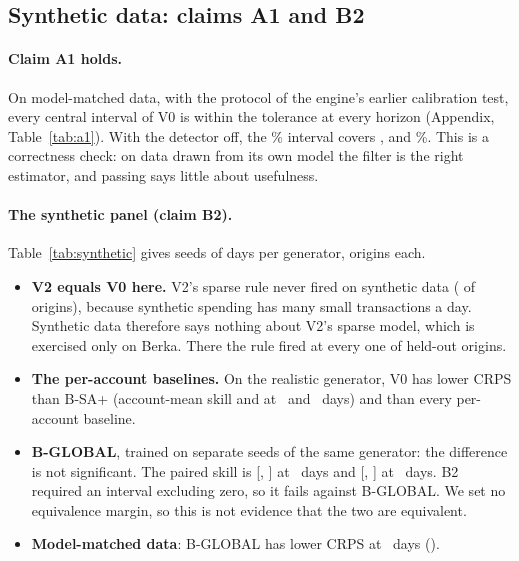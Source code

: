 \subsection{Synthetic data: claims A1 and B2}
\paragraph{Claim A1 holds.} On model-matched data, with the protocol of the
engine's earlier calibration test, every central interval of V0 is within
the tolerance at every horizon (Appendix, Table~\ref{tab:a1}). With the
detector off, the \lC\% interval covers ,
 and
\%. This is a correctness check: on
data drawn from its own model the filter is the right estimator, and
passing says little about usefulness.

\paragraph{The synthetic panel (claim B2).} Table~\ref{tab:synthetic}
gives  seeds of  days per generator,
 origins each.
\begin{itemize}
\item \textbf{V2 equals V0 here.} V2's sparse rule never fired on
  synthetic data ( of  origins), because
  synthetic spending has many small transactions a day. Synthetic data
  therefore says nothing about V2's sparse model, which is exercised only
  on Berka. There the rule fired at every one of 
  held-out origins.
\item \textbf{The per-account baselines.} On the realistic generator, V0
  has lower CRPS than B-SA+ (account-mean skill  and
   at \hB\ and \hC\ days) and than every
  per-account baseline.
\item \textbf{B-GLOBAL}, trained on  separate seeds of the
  same generator: the difference is not significant. The paired skill is
   [,
  ] at \hB\ days and
   [,
  ] at \hC\ days. B2 required an
  interval excluding zero, so it fails against B-GLOBAL. We set no
  equivalence margin, so this is not evidence that the two are
  equivalent.
\item \textbf{Model-matched data}: B-GLOBAL has lower CRPS at \hB\ days
  ().
\end{itemize}


